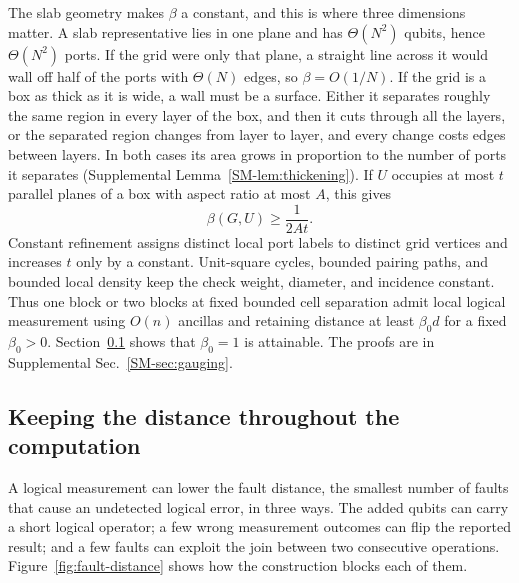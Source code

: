 The slab geometry makes $\beta$ a constant, and this is where three
dimensions matter.  A slab representative lies in one plane and has
$\Theta(N^2)$ qubits, hence $\Theta(N^2)$ ports.  If the grid were only that
plane, a straight line across it would wall off half of the ports with
$\Theta(N)$ edges, so $\beta=O(1/N)$.  If the grid is a box as thick as it is
wide, a wall must be a surface.  Either it separates roughly the same region
in every layer of the box, and then it cuts through all the layers, or the
separated region changes from layer to layer, and every change costs edges
between layers.  In both cases its area grows in proportion to the number of
ports it separates (Supplemental Lemma~\ref{SM-lem:thickening}).  If $U$
occupies at most $t$ parallel planes of a box with aspect ratio at most $A$,
this gives
\begin{equation}
 \beta(G,U)\ge\frac{1}{2At}.
 \label{eq:grid-bound}
\end{equation}
Constant refinement assigns distinct local port labels to distinct grid
vertices and increases $t$ only by a constant. Unit-square cycles, bounded
pairing paths, and bounded local density keep the check weight, diameter,
and incidence constant. Thus one block or two blocks at fixed bounded cell
separation admit local logical measurement using $O(n)$ ancillas and retaining
distance at least $\beta_0d$ for a fixed $\beta_0>0$. Section~\ref{sec:distance-floor}
shows that $\beta_0=1$ is attainable. The proofs are in
Supplemental Sec.~\ref{SM-sec:gauging}.

\subsection{Keeping the distance throughout the computation}
\label{sec:distance-floor}
A logical measurement can lower the fault distance, the smallest number of
faults that cause an undetected logical error, in three ways.  The added
qubits can carry a short logical operator; a few wrong measurement outcomes
can flip the reported result; and a few faults can exploit the join between
two consecutive operations.  Figure~\ref{fig:fault-distance} shows how the
construction blocks each of them.

